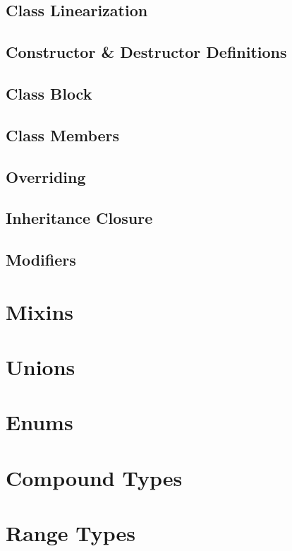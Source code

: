 \subsection{Class Linearization}

\subsection{Constructor \& Destructor Definitions}

\subsection{Class Block}

\subsection{Class Members}

\subsection{Overriding}

\subsection{Inheritance Closure}

\subsection{Modifiers}

\section{Mixins}

\section{Unions}

\section{Enums}

\section{Compound Types}

\section{Range Types}


